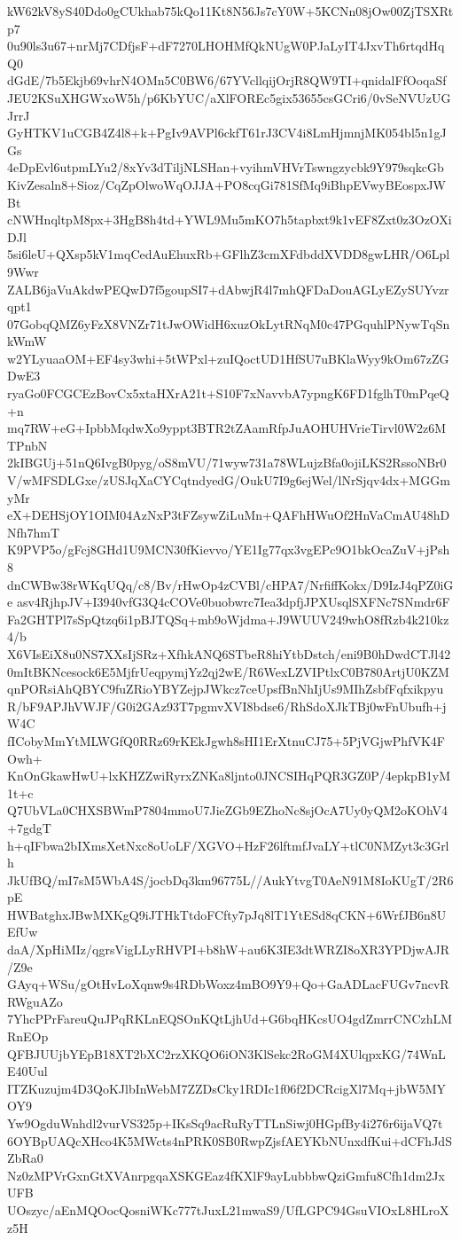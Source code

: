 kW62kV8yS40Ddo0gCUkhab75kQo11Kt8N56Js7cY0W+5KCNn08jOw00ZjTSXRtp7
0u90ls3u67+nrMj7CDfjsF+dF7270LHOHMfQkNUgW0PJaLyIT4JxvTh6rtqdHqQ0
dGdE/7b5Ekjb69vhrN4OMn5C0BW6/67YVcllqijOrjR8QW9TI+qnidalFfOoqaSf
JEU2KSuXHGWxoW5h/p6KbYUC/aXlFOREc5gix53655csGCri6/0vSeNVUzUGJrrJ
GyHTKV1uCGB4Z4l8+k+PgIv9AVPl6ckfT61rJ3CV4i8LmHjmnjMK054bl5n1gJGs
4eDpEvl6utpmLYu2/8xYv3dTiljNLSHan+vyihmVHVrTswngzycbk9Y979sqkcGb
KivZesaln8+Sioz/CqZpOlwoWqOJJA+PO8cqGi781SfMq9iBhpEVwyBEospxJWBt
cNWHnqltpM8px+3HgB8h4td+YWL9Mu5mKO7h5tapbxt9k1vEF8Zxt0z3OzOXiDJl
5si6leU+QXsp5kV1mqCedAuEhuxRb+GFlhZ3cmXFdbddXVDD8gwLHR/O6Lpl9Wwr
ZALB6jaVuAkdwPEQwD7f5goupSI7+dAbwjR4l7mhQFDaDouAGLyEZySUYvzrqpt1
07GobqQMZ6yFzX8VNZr71tJwOWidH6xuzOkLytRNqM0c47PGquhlPNywTqSnkWmW
w2YLyuaaOM+EF4sy3whi+5tWPxl+zuIQoctUD1HfSU7uBKlaWyy9kOm67zZGDwE3
ryaGo0FCGCEzBovCx5xtaHXrA21t+S10F7xNavvbA7ypngK6FD1fglhT0mPqeQ+n
mq7RW+eG+IpbbMqdwXo9yppt3BTR2tZAamRfpJuAOHUHVrieTirvl0W2z6MTPnbN
2kIBGUj+51nQ6IvgB0pyg/oS8mVU/71wyw731a78WLujzBfa0ojiLKS2RssoNBr0
V/wMFSDLGxe/zUSJqXaCYCqtndyedG/OukU7I9g6ejWel/lNrSjqv4dx+MGGmyMr
eX+DEHSjOY1OIM04AzNxP3tFZsywZiLuMn+QAFhHWuOf2HnVaCmAU48hDNfh7hmT
K9PVP5o/gFcj8GHd1U9MCN30fKievvo/YE1Ig77qx3vgEPc9O1bkOcaZuV+jPsh8
dnCWBw38rWKqUQq/c8/Bv/rHwOp4zCVBl/cHPA7/NrfiffKokx/D9IzJ4qPZ0iGe
asv4RjhpJV+I3940vfG3Q4cCOVe0buobwrc7Iea3dpfjJPXUsqlSXFNc7SNmdr6F
Fa2GHTPl7sSpQtzq6i1pBJTQSq+mb9oWjdma+J9WUUV249whO8fRzb4k210kz4/b
X6VIsEiX8u0NS7XXsIjSRz+XfhkANQ6STbeR8hiYtbDstch/eni9B0hDwdCTJl42
0mItBKNcesock6E5MjfrUeqpymjYz2qj2wE/R6WexLZVIPtlxC0B780ArtjU0KZM
qnPORsiAhQBYC9fuZRioYBYZejpJWkcz7ceUpsfBnNhIjUs9MIhZsbfFqfxikpyu
R/bF9APJhVWJF/G0i2GAz93T7pgmvXVI8bdse6/RhSdoXJkTBj0wFnUbufh+jW4C
fICobyMmYtMLWGfQ0RRz69rKEkJgwh8sHI1ErXtnuCJ75+5PjVGjwPhfVK4FOwh+
KnOnGkawHwU+lxKHZZwiRyrxZNKa8ljnto0JNCSIHqPQR3GZ0P/4epkpB1yM1t+c
Q7UbVLa0CHXSBWmP7804mmoU7JieZGb9EZhoNc8sjOcA7Uy0yQM2oKOhV4+7gdgT
h+qIFbwa2bIXmsXetNxc8oUoLF/XGVO+HzF26lftmfJvaLY+tlC0NMZyt3c3Grlh
JkUfBQ/mI7sM5WbA4S/jocbDq3km96775L//AukYtvgT0AeN91M8IoKUgT/2R6pE
HWBatghxJBwMXKgQ9iJTHkTtdoFCfty7pJq8lT1YtESd8qCKN+6WrfJB6n8UEfUw
daA/XpHiMIz/qgrsVigLLyRHVPI+b8hW+au6K3IE3dtWRZI8oXR3YPDjwAJR/Z9e
GAyq+WSu/gOtHvLoXqnw9s4RDbWoxz4mBO9Y9+Qo+GaADLacFUGv7ncvRRWguAZo
7YhcPPrFareuQuJPqRKLnEQSOnKQtLjhUd+G6bqHKcsUO4gdZmrrCNCzhLMRnEOp
QFBJUUjbYEpB18XT2bXC2rzXKQO6iON3KlSekc2RoGM4XUlqpxKG/74WnLE40Uul
ITZKuzujm4D3QoKJlbInWebM7ZZDsCky1RDIc1f06f2DCRcigXl7Mq+jbW5MYOY9
Yw9OgduWnhdl2vurVS325p+IKsSq9acRuRyTTLnSiwj0HGpfBy4i276r6ijaVQ7t
6OYBpUAQcXHco4K5MWcts4nPRK0SB0RwpZjsfAEYKbNUnxdfKui+dCFhJdSZbRa0
Nz0zMPVrGxnGtXVAnrpgqaXSKGEaz4fKXlF9ayLubbbwQziGmfu8Cfh1dm2JxUFB
UOszyc/aEnMQOocQosniWKc777tJuxL21mwaS9/UfLGPC94GsuVIOxL8HLroXz5H
